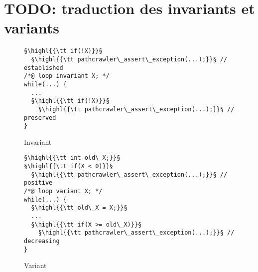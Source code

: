 \section{TODO: traduction des invariants et variants}

\begin{figure}[h]
  \begin{lstlisting}
§\highl{{\tt if(!X)}}§
  §\highl{{\tt pathcrawler\_assert\_exception(...);}}§ // established
/*@ loop invariant X; */
while(...) {
  ...
  §\highl{{\tt if(!X)}}§
    §\highl{{\tt pathcrawler\_assert\_exception(...);}}§ // preserved
}
  \end{lstlisting}
  \caption{Invariant}
\end{figure}

\begin{figure}[h]
  \begin{lstlisting}
§\highl{{\tt int old\_X;}}§
§\highl{{\tt if(X < 0)}}§
  §\highl{{\tt pathcrawler\_assert\_exception(...);}}§ // positive
/*@ loop variant X; */
while(...) {
  §\highl{{\tt old\_X = X;}}§
  ...
  §\highl{{\tt if(X >= old\_X)}}§
    §\highl{{\tt pathcrawler\_assert\_exception(...);}}§ // decreasing
}
  \end{lstlisting}
  \caption{Variant}
\end{figure}

